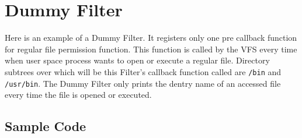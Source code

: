 \chapter{Dummy Filter}
\label{lab:dummy}
Here is an example of a Dummy Filter. It registers only one pre callback function for
regular file permission function. This function is called by the VFS every time when user
space process wants to open or execute a regular file. Directory subtrees over which
will be this Filter's callback function called are \texttt{/bin} and
\texttt{/usr/bin}. The Dummy Filter only prints the dentry name of an accessed file every
time the file is opened or executed.

\section{Sample Code}

